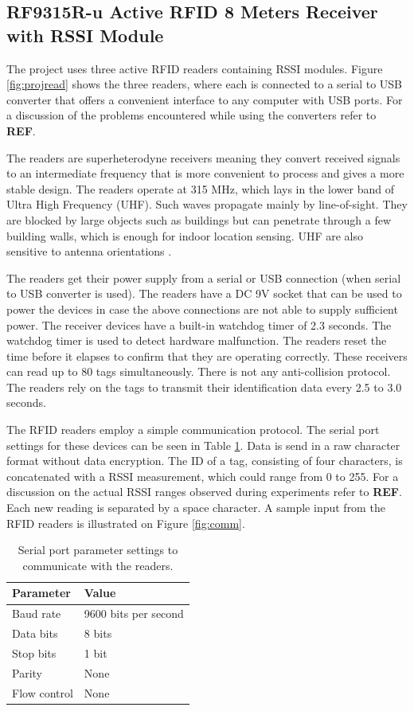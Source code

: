 \subsection{RF9315R-u Active RFID 8 Meters Receiver with RSSI Module}

The project uses three active RFID readers containing RSSI modules. Figure \ref{fig:projread} shows the three readers, where each is connected to a serial to USB converter that offers a convenient interface to any computer with USB ports. For a discussion of the problems encountered while using the converters refer to \textbf{REF}. 

The readers are superheterodyne receivers meaning they convert received signals to an intermediate frequency that is more convenient to process and gives a more stable design. The readers operate at 315 MHz, which lays in the lower band of Ultra High Frequency (UHF). Such waves propagate mainly by line-of-sight. They are blocked by large objects such as buildings but can penetrate through a few building walls, which is enough for indoor location sensing. UHF are also sensitive to antenna orientations \cite[p. 15]{Hunt2007}.

The readers get their power supply from a serial or USB connection (when serial to USB converter is used). The readers have a DC 9V socket that can be used to power the devices in case the above connections are not able to supply sufficient power. The receiver devices have a built-in watchdog timer of 2.3 seconds. The watchdog timer is used to detect hardware malfunction. The readers reset the time before it elapses to confirm that they are operating correctly. These receivers can read up to 80 tags simultaneously. There is not any anti-collision protocol. The readers rely on the tags to transmit their identification data every 2.5 to 3.0 seconds.

The RFID readers employ a simple communication protocol. The serial port settings for these devices can be seen in Table \ref{tbl:comm}. Data is send in a raw character format without data encryption. The ID of a tag, consisting of four characters, is concatenated with a RSSI measurement, which could range from 0 to 255. For a discussion on the actual RSSI ranges observed during experiments refer to \textbf{REF}. Each new reading is separated by a space character. A sample input from the RFID readers is illustrated on Figure \ref{fig:comm}. 

\begin{table}[h]
	\centering
	\begin{tabular}{ | m{4cm} || m{4cm} | }
		\hline
		\textbf{Parameter}		& \textbf{Value} \\ \hline
		Baud rate				& 9600 bits per second \\ \hline
		Data bits				& 8 bits \\ \hline
		Stop bits				& 1 bit \\ \hline
		Parity					& None \\ \hline
		Flow control			& None \\ \hline
	\end{tabular}
	\caption{Serial port parameter settings to communicate with the readers.}
	\label{tbl:comm}
\end{table}

